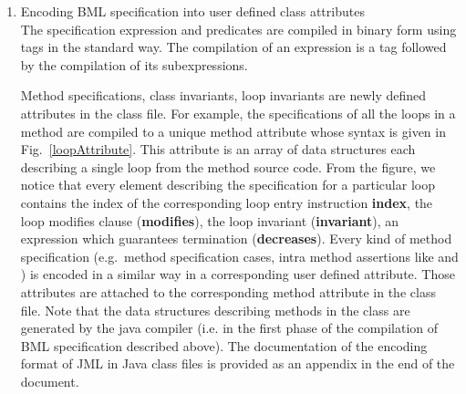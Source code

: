 \begin{enumerate}
\item Encoding BML specification  into user defined class attributes\\
  The specification expression and predicates
  are compiled in binary form using tags in the standard way. The compilation of an expression is a tag followed by the compilation of its subexpressions. 
    
 Method specifications, class invariants, loop invariants are newly defined attributes in the class file.
 For example, the specifications of all the loops in a method are compiled to a unique method attribute whose syntax is
 given in Fig.~\ref{loopAttribute}. This attribute is an array of data structures each describing a single loop from the method source code.
From the figure, we notice that every element describing the specification for a particular loop contains the index of the corresponding loop
entry instruction \textbf{index}, the loop modifies clause (\textbf{modifies}),
the loop invariant (\textbf{invariant}), an expression which guarantees termination (\textbf{decreases}). Every kind of method specification  
(e.g.\ method specification cases, intra method assertions like \assert{} and \set)
is encoded in a similar way in  a corresponding user defined attribute. Those attributes are attached to the corresponding
 method attribute in the class file. Note that the data structures describing methods in the class  are generated by the java compiler (i.e. in the first phase of the compilation of BML specification described above).  The documentation of the encoding format of JML in Java class files is provided as an appendix in the end of the document.

\end{enumerate}

